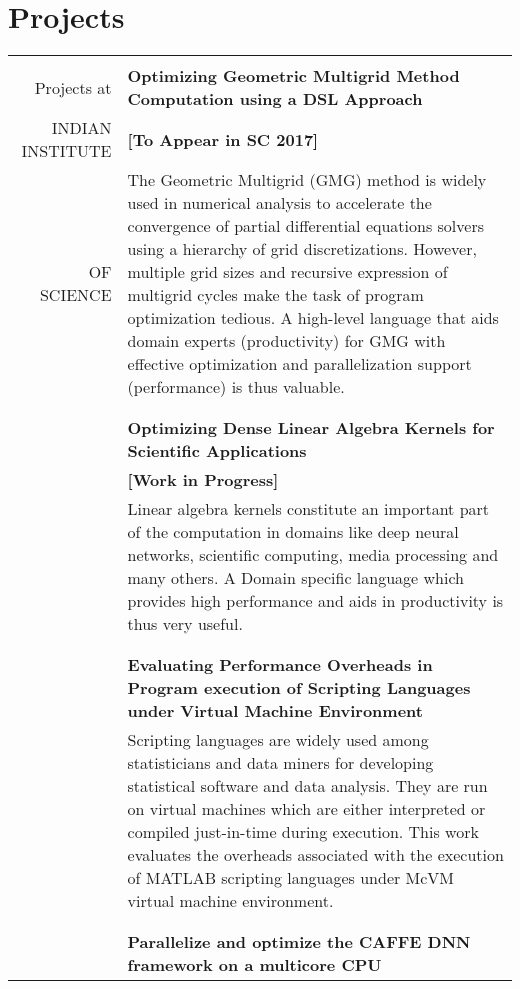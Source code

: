 \documentclass[a4paper,10pt]{article} %
\begin{document}
\section{Projects}
\begin{tabular}{rp{11cm}}
&\\
Projects at & \textbf{Optimizing Geometric Multigrid Method Computation using a DSL Approach} \\
INDIAN INSTITUTE & \hspace{25em} \textbf{[To Appear in SC 2017]} \\
OF SCIENCE 
& \setlength{\leftskip}{0.4cm}
The Geometric Multigrid (GMG) method is widely used in numerical analysis to accelerate the convergence of partial differential equations solvers using
a hierarchy of grid discretizations. However, multiple grid sizes and recursive 
expression of multigrid cycles make the task of program optimization tedious.
A high-level language that aids domain experts (productivity) for GMG with
effective optimization and parallelization support (performance) is thus valuable.\\
& \\
& \\
& \textbf{Optimizing Dense Linear Algebra Kernels for Scientific Applications} \\
& \hspace{25em} \textbf{[Work in Progress]}\\
& \setlength{\leftskip}{0.4cm}
Linear algebra kernels constitute an important part of the computation in domains like deep neural networks, scientific computing, media processing and many others. A Domain specific language which provides high performance and aids in productivity is thus very useful.\\
& \\
& \\
& \textbf{Evaluating Performance Overheads in Program execution of Scripting Languages under Virtual Machine Environment} \\
& \setlength{\leftskip}{0.4cm}
Scripting languages are widely used among statisticians and data miners for developing statistical software and data analysis. They are run on virtual machines which are either interpreted or compiled just-in-time during execution. This work evaluates the overheads associated with the execution of MATLAB scripting languages under McVM virtual machine environment.\\
& \\
& \\
& \textbf{Parallelize and optimize the CAFFE DNN framework on a multicore CPU}\\

\end{tabular}
\end{document}
